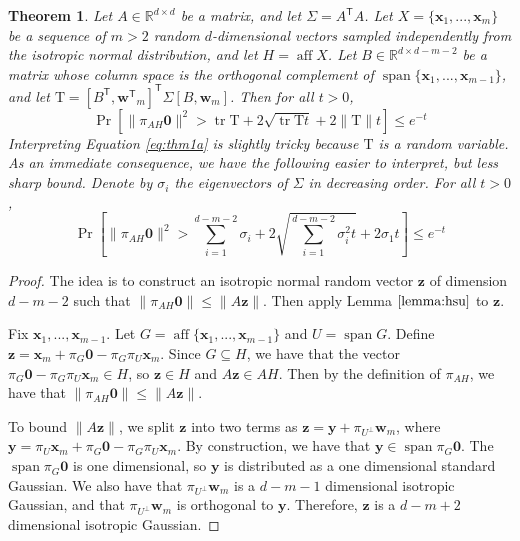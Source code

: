 \documentclass{article}
\newtheorem{theorem}{Theorem}
\theoremstyle{definition}
\DeclareMathOperator*{\affspan}{aff}
\DeclareMathOperator*{\vecspan}{span}
\DeclareMathOperator*{\tr}{tr}
\DeclareMathOperator*{\probop}{Pr}
\newcommand{\prob}[1]{\ensuremath{\probop\left[{#1}\right]}}
\newcommand{\proj}[1]{\ensuremath{\pi}_{#1}}
\newcommand{\ltwo}[1]{\lVert{#1}\rVert}
\newcommand{\trans}[1]{\ensuremath{{#1}^{\mathsf{T}}}}
\newcommand{\comp}[1]{\ensuremath{{#1}^\bot}}
\newcommand{\zero}{\mathbf{0}}
\newcommand{\w}{\mathbf{w}}
\newcommand{\x}{\mathbf{x}}
\newcommand{\y}{\mathbf{y}}
\newcommand{\z}{\mathbf{z}}
\newcommand{\Tau}{\mathrm{T}}
\begin{document}
\begin{theorem}
\label{thm:center}
Let $A \in \mathbb{R}^{d\times d}$ be a matrix,
and let $\Sigma = \trans A A$.
Let $X=\{\x_1,...,\x_m\}$ be a sequence of $m>2$ random $d$-dimensional vectors sampled independently from the isotropic normal distribution,
and let $H=\affspan X$.
Let $B\in\mathbb{R}^{d\times d-m-2}$ be a matrix whose column space is the orthogonal complement of $\vecspan \{\x_1,...,\x_{m-1}\}$,
and let $\Tau = \trans{[\trans B,\trans\w_m]}\Sigma[B,\w_m]$.
Then for all $t>0$,
\begin{equation}
\label{eq:thm1a}
\prob{\ltwo{\proj{AH}\zero}^2
>
\tr \Tau + 2\sqrt{\tr \Tau t} + 2\ltwo{\Tau}t} \le e^{-t}
\end{equation}
Interpreting Equation \ref{eq:thm1a} is slightly tricky because $\Tau$ is a random variable.
As an immediate consequence, we have the following easier to interpret, but less sharp bound.
Denote by $\sigma_i$ the eigenvectors of $\Sigma$ in decreasing order.
For all $t>0$,
\begin{equation}
\prob{\ltwo{\proj{AH}\zero}^2 > \sum_{i=1}^{d-m-2}\sigma_i + 2\sqrt{\sum_{i=1}^{d-m-2}\sigma_i^2t} + 2\sigma_1t} \le e^{-t}
\end{equation}
\end{theorem}

\noindent

\begin{proof}
The idea is to construct an isotropic normal random vector $\z$ of dimension $d-m-2$ such that $\ltwo{\proj{AH}\zero} \le \ltwo {A\z} $.
Then apply Lemma $\ref{lemma:hsu}$ to $\z$.

Fix $\x_1,...,\x_{m-1}$.
Let $G=\affspan\{\x_1,...,\x_{m-1}\}$ and $U=\vecspan G$.
Define
$
\z
=
\x_m +\proj{G}\zero-\proj{G}\proj{U}\x_m
$.
Since $G\subseteq H$, we have that the vector $\proj{G}\zero-\proj{G}\proj{U}\x_m\in H$,
so $\z\in H$ and $A\z\in AH$.
Then by the definition of $\proj{AH}$, we have that $\ltwo {\proj{AH}\zero}\le\ltwo{A\z}$.

To bound $\ltwo{A\z}$, we split $\z$ into two terms as $\z=\y+\proj{\comp U}\w_m$, where $\y=\proj{U}\x_m+\proj{G}\zero-\proj{G}\proj{U}\x_m$.
By construction, we have that $\y\in\vecspan{\proj{G}\zero}$.
The $\vecspan{\proj{G}\zero}$ is one dimensional, so $\y$ is distributed as a one dimensional standard Gaussian.
We also have that $\proj{\comp U}\w_m$ is a $d-m-1$ dimensional isotropic Gaussian,
and that $\proj{\comp U}\w_m$ is orthogonal to $\y$.
Therefore, $\z$ is a $d-m+2$ dimensional isotropic Gaussian.
\end{proof}
\end{document}
